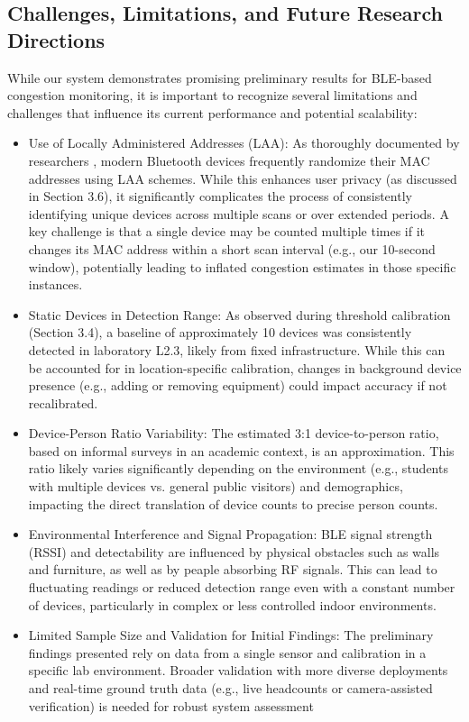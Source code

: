 \documentclass[runningheads]{llncs}
\begin{document}
\subsection{Challenges, Limitations, and Future Research Directions}
While our system demonstrates promising preliminary results for BLE-based congestion monitoring, it is important to recognize several limitations and challenges that influence its current performance and potential scalability:
\begin{itemize}
    \item Use of Locally Administered Addresses (LAA): As thoroughly documented by researchers \cite{Martin2017}, modern Bluetooth devices frequently randomize their MAC addresses using LAA schemes. While this enhances user privacy (as discussed in Section 3.6), it significantly complicates the process of consistently identifying unique devices across multiple scans or over extended periods. A key challenge is that a single device may be counted multiple times if it changes its MAC address within a short scan interval (e.g., our 10-second window), potentially leading to inflated congestion estimates in those specific instances.
    \item     Static Devices in Detection Range: As observed during threshold calibration (Section 3.4), a baseline of approximately 10 devices was consistently detected in laboratory L2.3, likely from fixed infrastructure. While this can be accounted for in location-specific calibration, changes in background device presence (e.g., adding or removing equipment) could impact accuracy if not recalibrated.
    \item     Device-Person Ratio Variability: The estimated 3:1 device-to-person ratio, based on informal surveys in an academic context, is an approximation. This ratio likely varies significantly depending on the environment (e.g., students with multiple devices vs. general public visitors) and demographics, impacting the direct translation of device counts to precise person counts.
    \item     Environmental Interference and Signal Propagation: BLE signal strength (RSSI) and detectability are influenced by physical obstacles such as walls and furniture, as well as by peaple absorbing RF signals. This can lead to fluctuating readings or reduced detection range even with a constant number of devices, particularly in complex or less controlled indoor environments.
    \item     Limited Sample Size and Validation for Initial Findings: The preliminary findings presented rely on data from a single sensor and calibration in a specific lab environment. Broader validation with more diverse deployments and real-time ground truth data (e.g., live headcounts or camera-assisted verification) is needed for robust system assessment
\end{itemize}
\end{document}
